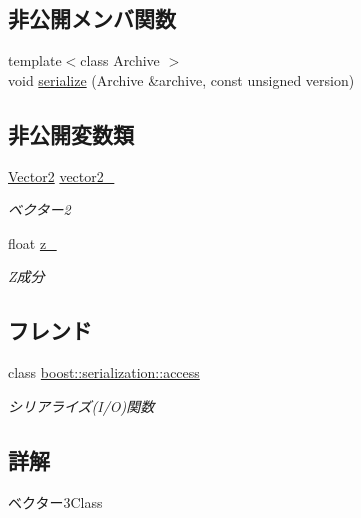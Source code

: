 \subsection*{非公開メンバ関数}
\begin{DoxyCompactItemize}
\item 
{\footnotesize template$<$class Archive $>$ }\\void \mbox{\hyperlink{class_md_bin_data_1_1_vector3_af1b8febb3546990575e4b6ba7496b619}{serialize}} (Archive \&archive, const unsigned version)
\end{DoxyCompactItemize}
\subsection*{非公開変数類}
\begin{DoxyCompactItemize}
\item 
\mbox{\hyperlink{class_md_bin_data_1_1_vector2}{Vector2}} \mbox{\hyperlink{class_md_bin_data_1_1_vector3_a312b71252e8b585d01c6aaade102b8bc}{vector2\+\_\+}}
\begin{DoxyCompactList}\small\item\em ベクター2 \end{DoxyCompactList}\item 
float \mbox{\hyperlink{class_md_bin_data_1_1_vector3_a5bf432978dbd9411afe66e69fd8aaaef}{z\+\_\+}}
\begin{DoxyCompactList}\small\item\em Z成分 \end{DoxyCompactList}\end{DoxyCompactItemize}
\subsection*{フレンド}
\begin{DoxyCompactItemize}
\item 
class \mbox{\hyperlink{class_md_bin_data_1_1_vector3_ac98d07dd8f7b70e16ccb9a01abf56b9c}{boost\+::serialization\+::access}}
\begin{DoxyCompactList}\small\item\em シリアライズ(I/O)関数 \end{DoxyCompactList}\end{DoxyCompactItemize}


\subsection{詳解}
ベクター3\+Class 

